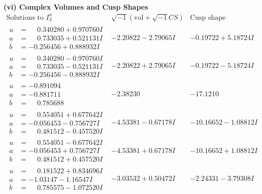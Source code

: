 \documentclass[1p]{elsarticle_modified}
\theoremstyle{definition}
\newcommand{\I}{\sqrt{-1}}
\begin{document}
\newpage\flushleft \textbf{(vi) Complex Volumes and Cusp Shapes}
$$\begin{array}{c|c|c}  
\text{Solutions to }I^u_{3}& \I (\text{vol} + \sqrt{-1}CS) & \text{Cusp shape}\\
 \hline 
\begin{aligned}
u &= \phantom{-}0.340280 + 0.970760 I \\
a &= \phantom{-}0.733035 + 0.521131 I \\
b &= -0.256456 + 0.888932 I\end{aligned}
 & -2.20822 - 2.79065 I & -0.19722 + 5.18724 I \\ \hline\begin{aligned}
u &= \phantom{-}0.340280 - 0.970760 I \\
a &= \phantom{-}0.733035 - 0.521131 I \\
b &= -0.256456 - 0.888932 I\end{aligned}
 & -2.20822 + 2.79065 I & -0.19722 - 5.18724 I \\ \hline\begin{aligned}
u &= -0.891094\phantom{ +0.000000I} \\
a &= -0.881711\phantom{ +0.000000I} \\
b &= \phantom{-}0.785688\phantom{ +0.000000I}\end{aligned}
 & -2.38230\phantom{ +0.000000I} & -17.1210\phantom{ +0.000000I} \\ \hline\begin{aligned}
u &= \phantom{-}0.554051 + 0.677642 I \\
a &= -0.056453 - 0.756727 I \\
b &= \phantom{-}0.481512 - 0.457520 I\end{aligned}
 & -4.53381 - 0.67178 I & -10.16652 - 1.08812 I \\ \hline\begin{aligned}
u &= \phantom{-}0.554051 - 0.677642 I \\
a &= -0.056453 + 0.756727 I \\
b &= \phantom{-}0.481512 + 0.457520 I\end{aligned}
 & -4.53381 + 0.67178 I & -10.16652 + 1.08812 I \\ \hline\begin{aligned}
u &= \phantom{-}0.181522 + 0.834696 I \\
a &= -1.03147 - 1.16547 I \\
b &= \phantom{-}0.785575 - 1.072520 I\end{aligned}
 & -3.03532 + 0.50472 I & -2.24331 - 3.79308 I \\ \hline\begin{aligned}

\end{aligned}
\end{array}$$
\end{document}

